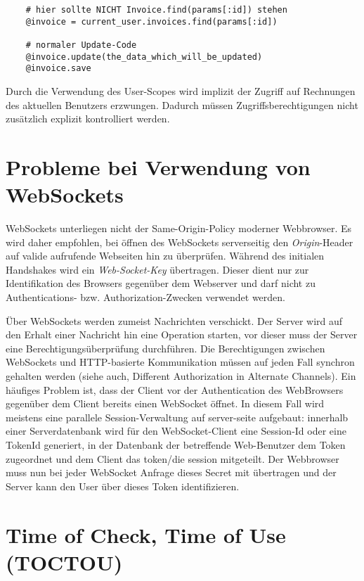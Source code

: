 \begin{verbatim}
	# hier sollte NICHT Invoice.find(params[:id]) stehen
	@invoice = current_user.invoices.find(params[:id])

	# normaler Update-Code
	@invoice.update(the_data_which_will_be_updated)
	@invoice.save
\end{verbatim}

Durch die Verwendung des User-Scopes wird implizit der Zugriff auf Rechnungen des aktuellen Benutzers erzwungen. Dadurch müssen Zugriffsberechtigungen nicht zusätzlich explizit kontrolliert werden.

\section{Probleme bei Verwendung von WebSockets} 

WebSockets unterliegen nicht der Same-Origin-Policy moderner Webbrowser. Es wird daher empfohlen, bei öffnen des WebSockets serverseitig den \textit{Origin}-Header auf valide aufrufende Webseiten hin zu überprüfen. Während des initialen Handshakes wird ein \textit{Web-Socket-Key} übertragen. Dieser dient nur zur Identifikation des Browsers gegenüber dem Webserver und darf nicht zu Authentications- bzw. Authorization-Zwecken verwendet werden.

Über WebSockets werden zumeist Nachrichten verschickt. Der Server wird auf den Erhalt einer Nachricht hin eine Operation starten, vor dieser muss der Server eine Berechtigungsüberprüfung durchführen. Die Berechtigungen zwischen WebSockets und HTTP-basierte Kommunikation müssen auf jeden Fall synchron gehalten werden (siehe auch, Different Authorization in Alternate Channels).  
Ein häufiges Problem ist, dass der Client vor der Authentication des WebBrowsers gegenüber dem Client bereits einen WebSocket öffnet. In diesem Fall wird meistens eine parallele Session-Verwaltung auf server-seite aufgebaut: innerhalb einer Serverdatenbank wird für den WebSocket-Client eine Session-Id oder eine TokenId generiert, in der Datenbank der betreffende Web-Benutzer dem Token zugeordnet und dem Client das token/die session mitgeteilt. Der Webbrowser muss nun bei jeder WebSocket Anfrage dieses Secret mit übertragen und der Server kann den User über dieses Token identifizieren.

\section{Time of Check, Time of Use (TOCTOU)}

